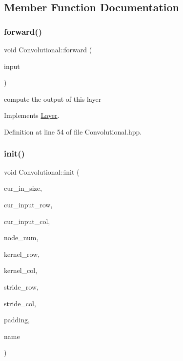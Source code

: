 \subsection{Member Function Documentation}
\mbox{\label{class_convolutional_ae52748139bd1a17a77525290086d8ad8}} 
\subsubsection{\texorpdfstring{forward()}{forward()}}
{\footnotesize\ttfamily void Convolutional\+::forward (\begin{DoxyParamCaption}\item[{std\+::vector$<$ Eigen\+::\+Matrix\+Xd $>$}]{input }\end{DoxyParamCaption})\hspace{0.3cm}{\ttfamily [virtual]}}



compute the output of this layer 



Implements \hyperlink{class_layer_ac0b116d692ea457f8e7c0f79f7159004}{Layer}.



Definition at line 54 of file Convolutional.\+hpp.

\mbox{\label{class_convolutional_a40c5772cf002e82be65a03547042c828}} 
\subsubsection{\texorpdfstring{init()}{init()}\hspace{0.1cm}{\footnotesize\ttfamily [1/2]}}
{\footnotesize\ttfamily void Convolutional\+::init (\begin{DoxyParamCaption}\item[{int}]{cur\+\_\+in\+\_\+size,  }\item[{int}]{cur\+\_\+input\+\_\+row,  }\item[{int}]{cur\+\_\+input\+\_\+col,  }\item[{double}]{node\+\_\+num,  }\item[{double}]{kernel\+\_\+row,  }\item[{double}]{kernel\+\_\+col,  }\item[{double}]{stride\+\_\+row,  }\item[{double}]{stride\+\_\+col,  }\item[{std\+::string}]{padding,  }\item[{std\+::string}]{name }\end{DoxyParamCaption})\hspace{0.3cm}{\ttfamily [virtual]}}



